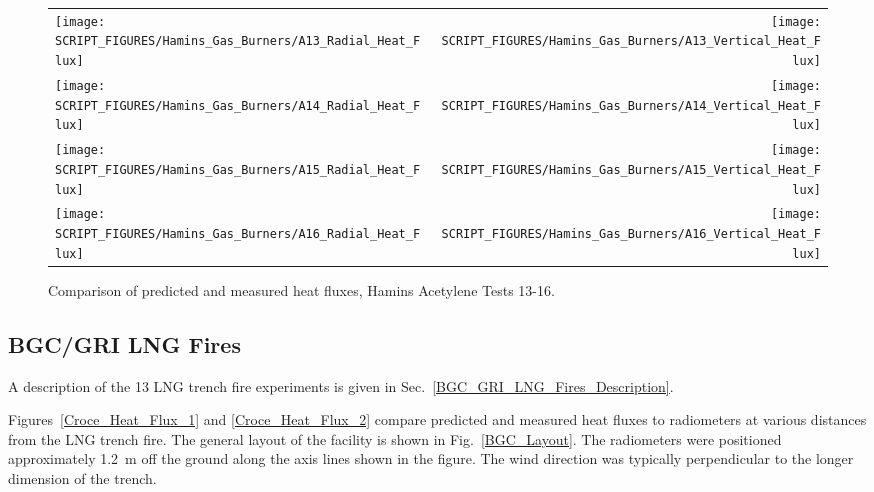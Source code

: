 \begin{figure}[p]
\begin{tabular*}{\textwidth}{l@{\extracolsep{\fill}}r}
\texttt{[image: SCRIPT\_FIGURES/Hamins\_Gas\_Burners/A13\_Radial\_Heat\_Flux]} &
\texttt{[image: SCRIPT\_FIGURES/Hamins\_Gas\_Burners/A13\_Vertical\_Heat\_Flux]} \\
\texttt{[image: SCRIPT\_FIGURES/Hamins\_Gas\_Burners/A14\_Radial\_Heat\_Flux]} &
\texttt{[image: SCRIPT\_FIGURES/Hamins\_Gas\_Burners/A14\_Vertical\_Heat\_Flux]} \\
\texttt{[image: SCRIPT\_FIGURES/Hamins\_Gas\_Burners/A15\_Radial\_Heat\_Flux]} &
\texttt{[image: SCRIPT\_FIGURES/Hamins\_Gas\_Burners/A15\_Vertical\_Heat\_Flux]} \\
\texttt{[image: SCRIPT\_FIGURES/Hamins\_Gas\_Burners/A16\_Radial\_Heat\_Flux]} &
\texttt{[image: SCRIPT\_FIGURES/Hamins\_Gas\_Burners/A16\_Vertical\_Heat\_Flux]}
\end{tabular*}
\label{Hamins_Acetylene_13-16}
\caption[Heat flux predictions, Hamins acetylene burner Tests 13-16]
{Comparison of predicted and measured heat fluxes, Hamins Acetylene Tests 13-16.}
\end{figure}

\clearpage

\subsection{BGC/GRI LNG Fires}
\label{BGC_GRI_LNG_Fires_Heat_Flux}

A description of the 13 LNG trench fire experiments is given in Sec.~\ref{BGC_GRI_LNG_Fires_Description}.

Figures~\ref{Croce_Heat_Flux_1} and \ref{Croce_Heat_Flux_2} compare predicted and measured heat fluxes to radiometers at various distances from the LNG trench fire. The general layout of the facility is shown in Fig.~\ref{BGC_Layout}. The radiometers were positioned approximately 1.2~m off the ground along the axis lines shown in the figure. The wind direction was typically perpendicular to the longer dimension of the trench.



